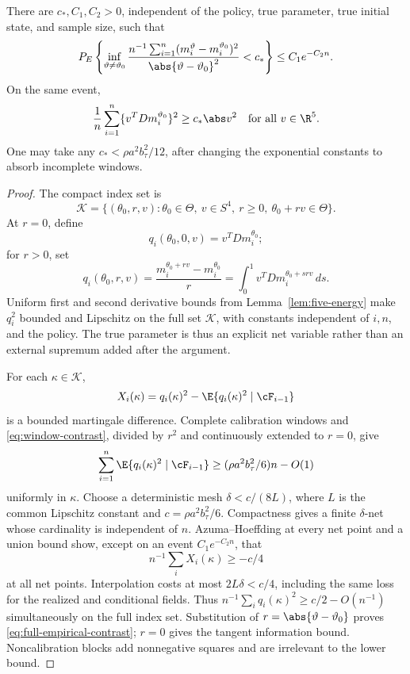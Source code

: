 \begin{proposition}
\label{prop:balanced-contrast}
There are \(c_*,C_1,C_2>0\), independent of the policy, true parameter,
true initial state, and sample size, such that
\begin{equation}
 P_E\left\{
 \inf_{\vartheta\ne\vartheta_0}
 \frac{n^{-1}\sum_{i=1}^n
 (m_i^\vartheta-m_i^{\vartheta_0})^2}
      {\abs{\vartheta-\vartheta_0}^2}<c_*
 \right\}\le C_1e^{-C_2n}.
 \label{eq:full-empirical-contrast}
\end{equation}
On the same event,
\[
 \frac1n\sum_{i=1}^n
 \{v^TDm_i^{\vartheta_0}\}^2\ge c_*\abs v^2
 \quad\hbox{for all }v\in\R^5.
\]
One may take any \(c_*<\rho a^2b_\tau^2/12\), after changing the exponential
constants to absorb incomplete windows.
\end{proposition}

\begin{proof}
The compact index set is
\[
 \mathscr K=\{(\theta_0,r,v):\theta_0\in\Theta,\ v\in S^4,\ r\ge0,
 \ \theta_0+rv\in\Theta\}.
\]
At \(r=0\), define
\[
 q_i(\theta_0,0,v)=v^TDm_i^{\theta_0};
\]
for \(r>0\), set
\[
 q_i(\theta_0,r,v)=
 \frac{m_i^{\theta_0+rv}-m_i^{\theta_0}}r
 =\int_0^1v^TDm_i^{\theta_0+srv}\,ds.
\]
Uniform first and second derivative bounds from Lemma~\ref{lem:five-energy}
make \(q_i^2\) bounded and Lipschitz on the full set \(\mathscr K\), with
constants independent of \(i,n\), and the policy.  The true parameter is thus
an explicit net variable rather than an external supremum added after the
argument.

For each \(\kappa\in\mathscr K\),
\[
 X_i(\kappa)=q_i(\kappa)^2-
 \E\{q_i(\kappa)^2\mid\cF_{i-1}\}
\]
is a bounded martingale difference.  Complete calibration windows and
\eqref{eq:window-contrast}, divided by \(r^2\) and continuously extended to
\(r=0\), give
\[
 \sum_{i=1}^n\E\{q_i(\kappa)^2\mid\cF_{i-1}\}
 \ge(\rho a^2b_\tau^2/6)n-O(1)
\]
uniformly in \(\kappa\).  Choose a deterministic mesh
\(\delta<c/(8L)\), where \(L\) is the common Lipschitz constant and
\(c=\rho a^2b_\tau^2/6\).  Compactness gives a finite \(\delta\)-net whose
cardinality is independent of \(n\).  Azuma--Hoeffding at every net point and
a union bound show, except on an event \(C_1e^{-C_2n}\), that
\[
 n^{-1}\sum_iX_i(\kappa)\ge-c/4
\]
at all net points.  Interpolation costs at most \(2L\delta<c/4\), including
the same loss for the realized and conditional fields.  Thus
\(n^{-1}\sum_iq_i(\kappa)^2\ge c/2-O(n^{-1})\) simultaneously on the full
index set.  Substitution of
\(r=\abs{\vartheta-\vartheta_0}\) proves
\eqref{eq:full-empirical-contrast}; \(r=0\) gives the tangent information
bound.  Noncalibration blocks add nonnegative squares and are irrelevant to
the lower bound.
\end{proof}

